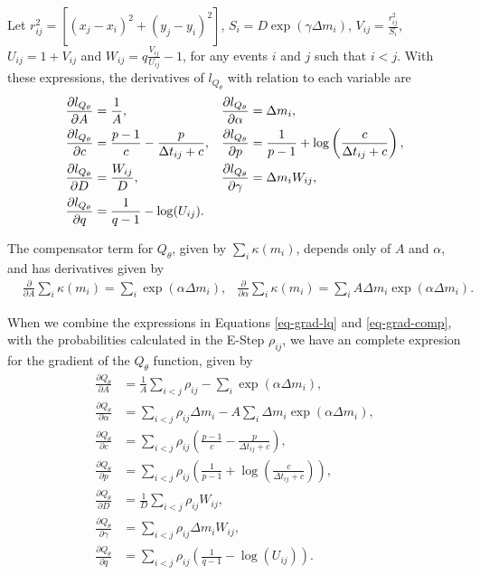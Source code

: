Let $r_{ij}^{2} = \left[(x_{j} - x_{i})^{2} + (y_{j} - y_{i})^{2}\right]$, $S_{i} = D\exp(\gamma\Delta m_{i})$, $V_{ij} = \frac{r_{ij}^{2}}{S_{i}}$, $U_{ij} = 1 + V_{ij}$ and $W_{ij} = q\frac{V_{ij}}{U_{ij}} - 1$, for any events $i$ and $j$ such that $i < j$. With these expressions, the derivatives of $l_{Q_{\theta}}$ with relation to each variable are
\begin{align}
  \label{eq-grad-lq}
    &\frac{\partial l_{Q_{\theta}}}{\partial A} = \frac{1}{A}, &\frac{\partial l_{Q_{\theta}}}{\partial \alpha} &= \Delta m_{i}, \notag \\
    &\frac{\partial l_{Q_{\theta}}}{\partial c} = \frac{p - 1}{c} - \frac{p}{\Delta t_{ij} + c}, &\frac{\partial l_{Q_{\theta}}}{\partial p} &= \frac{1}{p - 1} + \log\left(\frac{c}{\Delta t_{ij} + c}\right), \notag \\
    &\frac{\partial l_{Q_{\theta}}}{\partial D} = \frac{W_{ij}}{D}, &\frac{\partial l_{Q_{\theta}}}{\partial \gamma} &= \Delta m_{i}W_{ij}, \notag \\
  &\frac{\partial l_{Q_{\theta}}}{\partial q} = \frac{1}{q- 1} - \log(U_{ij}).
\end{align}

The compensator term for $Q_{\theta}$, given by $\sum_{i}\kappa(m_{i})$, depends only of $A$ and $\alpha$, and has derivatives given by
\begin{align}
  \label{eq-grad-comp}
    &\frac{\partial}{\partial A}\sum_{i}\kappa(m_{i}) = \sum_{i}\exp(\alpha\Delta m_{i}), &\frac{\partial}{\partial \alpha}\sum_{i}\kappa(m_{i}) = \sum_{i}A\Delta m_{i}\exp(\alpha\Delta m_{i}).
\end{align}

When we combine the expressions in Equations \eqref{eq-grad-lq} and \eqref{eq-grad-comp}, with the probabilities calculated in the E-Step $\rho_{ij}$, we have an complete expresion for the gradient of the $Q_{\theta}$ function, given by
\begin{equation}
  \label{eq-grad-q}
  \begin{split}
    \frac{\partial Q_{\theta}}{\partial A} &= \frac{1}{A}\sum_{i < j}\rho_{ij} - \sum_{i}\exp(\alpha\Delta m_{i}), \\
    \frac{\partial Q_{\theta}}{\partial \alpha} &= \sum_{i < j}\rho_{ij}\Delta m_{i} - A\sum_{i}\Delta m_{i}\exp(\alpha\Delta m_{i}), \\
    \frac{\partial Q_{\theta}}{\partial c} &= \sum_{i < j}\rho_{ij}\left(\frac{p - 1}{c} - \frac{p}{\Delta t_{ij} + c}\right), \\
    \frac{\partial Q_{\theta}}{\partial p} &= \sum_{i < j}\rho_{ij}\left(\frac{1}{p - 1} + \log\left(\frac{c}{\Delta t_{ij} + c}\right)\right), \\
    \frac{\partial Q_{\theta}}{\partial D} &= \frac{1}{D}\sum_{i < j}\rho_{ij}W_{ij}, \\
    \frac{\partial Q_{\theta}}{\partial \gamma} &= \sum_{i < j}\rho_{ij}\Delta m_{i}W_{ij}, \\
    \frac{\partial Q_{\theta}}{\partial q} &= \sum_{i < j}\rho_{ij}\left(\frac{1}{q - 1} - \log(U_{ij})\right).
  \end{split}
\end{equation}

